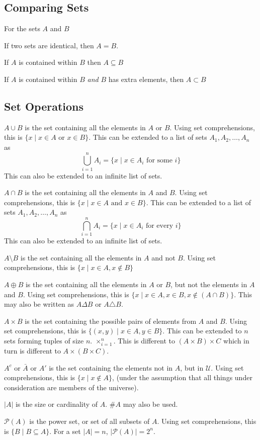\documentclass[10pt]{article}
\DeclareMathOperator*{\cart}{\times}
\begin{document}
\subsection{Comparing Sets}
For the sets $A$ and $B$
\begin{itemize*}
\item If two sets are identical, then $A=B$.
\item If $A$ is contained within $B$ then $A\subseteq B$
\item If $A$ is contained within $B$ \emph{and} $B$ has extra elements, then  $A\subset B$
\end{itemize*}
\subsection{Set Operations}
\begin{itemize*}
\item $A\cup B$ is the set containing all the elements in $A$ or $B$.  Using set comprehensions, this is $\{x\mid x\in A\text{ or }x\in B\}$. This can be extended to a list of sets $A_1,A_2,\ldots,A_n$ as \[\bigcup_{i=1}^nA_i=\{x\mid x\in A_i\text{ for some }i\}\]This can also be extended to an infinite list of sets.
\item $A\cap B$ is the set containing all the elements in $A$ and $B$.  Using set comprehensions, this is $\{x\mid x\in A\text{ and }x\in B\}$.  This can be extended to a list of sets $A_1,A_2,\ldots,A_n$ as \[\bigcap_{i=1}^nA_i=\{x\mid x\in A_i\text{ for every }i\}\]This can also be extended to an infinite list of sets.
\item $A\setminus B$ is the set containing all the elements in $A$ and not $B$. Using set comprehensions, this is $\{x\mid x\in A, x\not\in B\}$
\item $A\oplus B$ is the set containing all the elements in $A$ or $B$, but not the elements in $A$ and $B$.  Using set comprehensions, this is $\{x\mid x\in A, x\in B, x\not\in(A\cap B)\}$.  This may also be written as $A\Delta B$ or $A\triangle B$.
\item $A\times B$ is the set containing the possible pairs of elements from $A$ and $B$.  Using set comprehensions, this is $\{(x,y)\mid x\in A, y\in B\}$.  This can be extended to $n$ sets forming tuples of size $n$.  $\cart_{i=1}^n$.  This is different to $(A\times B)\times C$ which in turn is different to $A\times(B\times C)$.
\item $A^c$ or $\bar A$ or $A'$ is the set containing the elements not in $A$, but in $\mathcal U$.  Using set comprehensions, this is $\{x\mid x\not\in A\}$, (under the assumption that all things under consideration are members of the universe).
\item $\left|A\right|$ is the size or cardinality of $A$. $\#A$ may also be used.
\item $\mathcal P(A)$ is the power set, or set of all subsets of $A$. Using set comprehensions, this is $\{B\mid B\subseteq A\}$.  For a set $\left|A\right|=n$, $\left|\mathcal P(A)\right|=2^n$.
\end{itemize*}
\end{document}
